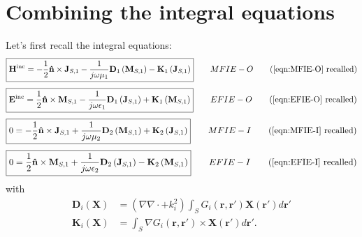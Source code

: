 \documentclass[a4paper,10pt]{book}
\newcommand{\field}[1]{\mathbf{#1}}
\newcommand{\current}[1]{\mathbf{#1}}
\newcommand{\vect}[1]{\mathbf{#1}}
\newcommand{\operator}[1]{\mathbf{#1}}
\begin{document}
\section{Combining the integral equations}
%
\par
Let's first recall the integral equations:
\begin{equation*}
\boxed{
\field{H}^\text{inc} = - \frac{1}{2} \vect{\hat{n}} \times \current{J}_{S,1} - \frac{1}{j \omega \mu_1} \operator{D}_1 \left( \current{M}_{S,1}\right) - \operator{K}_1 \left(\current{J}_{S,1}\right)
} \qquad MFIE-O \tag{\ref{eqn:MFIE-O} recalled}
\end{equation*}
\begin{equation*}
\boxed{
\field{E}^\text{inc} =  \frac{1}{2} \vect{\hat{n}} \times \current{M}_{S,1} - \frac{1}{j \omega \epsilon_1} \operator{D}_1 \left( \current{J}_{S,1}\right) + \operator{K}_1 \left(\current{M}_{S,1}\right)
} \qquad EFIE-O \tag{\ref{eqn:EFIE-O} recalled}
\end{equation*}
\begin{equation*}
\boxed{
0 = - \frac{1}{2} \vect{\hat{n}} \times \current{J}_{S,1} + \frac{1}{j \omega \mu_2} \operator{D}_2\left(\current{M}_{S,1}\right) +  \operator{K}_2\left( \current{J}_{S,1}\right)
} \qquad MFIE-I \tag{\ref{eqn:MFIE-I} recalled}
\end{equation*}
\begin{equation*}
\boxed{
0 = \frac{1}{2} \vect{\hat{n}} \times \current{M}_{S,1} + \frac{1}{j \omega \epsilon_2} \operator{D}_2\left(\current{J}_{S,1}\right) -  \operator{K}_2\left( \current{M}_{S,1}\right)
} \qquad EFIE-I \tag{\ref{eqn:EFIE-I} recalled}
\end{equation*}
with
\begin{align*}
\operator{D}_i\left(\current{X}\right) &= \left(\nabla \nabla \cdot + k_i^2\right) \int_{S} G_i\left(\vect{r}, \vect{r}'\right) \current{X}\left(\vect{r}'\right) d\vect{r}' \\
\operator{K}_i\left(\current{X}\right) &= \int_S \nabla G_i\left(\vect{r}, \vect{r}'\right) \times \current{X}\left(\vect{r}'\right) d\vect{r}'.
\end{align*}
\end{document}
